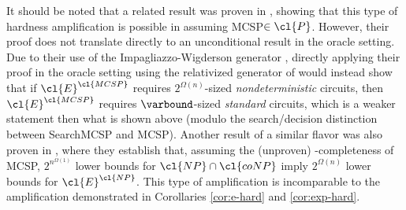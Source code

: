 It should be noted that a related result was proven in \cite{circuit-minimization}, showing that this type of hardness amplification is possible in  assuming {\sc MCSP}$ \in \cl{P}$. However, their proof does not translate directly to an unconditional result in the oracle setting. Due to their use of the Impagliazzo-Wigderson generator \cite{IW}, directly applying their proof in the oracle setting using the relativized generator of \cite{AM-derandomization} would instead show that  if $\cl{E}^\cl{MCSP}$ requires $2^{\Omega(n)}$-sized \emph{nondeterministic} circuits, then $\cl{E}^\cl{MCSP}$ requires $\varbound$-sized \emph{standard} circuits, which is a weaker statement then what is shown above (modulo the search/decision distinction between {\sc Search\dash MCSP} and {\sc MCSP}). Another result of a similar flavor was also proven in \cite{Hitchcock-Pavan}, where they establish that, assuming the (unproven) -completeness of {\sc MCSP}, $2^{n^{\Omega(1)}}$ lower bounds for $\cl{NP} \cap \cl{coNP}$ imply $2^{\Omega(n)}$ lower bounds for $\cl{E}^\cl{NP}$. This type of amplification is incomparable to the amplification demonstrated in Corollaries \ref{cor:e-hard} and \ref{cor:exp-hard}.

